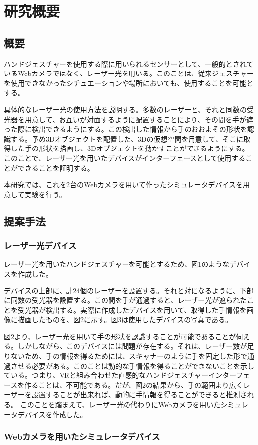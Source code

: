 \section{研究概要}

\subsection{概要}
ハンドジェスチャーを使用する際に用いられるセンサーとして、一般的とされているWebカメラではなく、レーザー光を用いる。このことは、従来ジェスチャーを使用できなかったシチュエーションや場所においても、使用することを可能とする。

具体的なレーザー光の使用方法を説明する。多数のレーザーと、それと同数の受光器を用意して、お互いが対面するように配置することにより、その間を手が遮った際に検出できるようにする。この検出した情報から手のおおよその形状を認識する。予め3Dオブジェクトを配置した、3Dの仮想空間を用意して、そこに取得した手の形状を描画し、3Dオブジェクトを動かすことができるようにする。このことで、レーザー光を用いたデバイスがインターフェースとして使用することができることを証明する。

本研究では、これを2台のWebカメラを用いて作ったシミュレータデバイスを用意して実験を行う。

\subsection{提案手法}
\subsubsection{レーザー光デバイス}
レーザー光を用いたハンドジェスチャーを可能とするため、図1のようなデバイスを作成した。

デバイスの上部に、計24個のレーザーを設置する。それと対になるように、下部に同数の受光器を設置する。この間を手が通過すると、レーザー光が遮られたことを受光器が検出する。実際に作成したデバイスを用いて、取得した手情報を画像に描画したものを、図2に示す。図3は使用したデバイスの写真である。

図2より、レーザー光を用いて手の形状を認識することが可能であることが伺える。しかしながら、このデバイスには問題が存在する。それは、レーザー数が足りないため、手の情報を得るためには、スキャナーのように手を固定した形で通過させる必要がある。このことは動的な手情報を得ることができないことを示している。つまり、VRと組み合わせた直感的なハンドジェスチャーインターフェースを作ることは、不可能である。だが、図2の結果から、手の範囲より広くレーザーを設置することが出来れば、動的に手情報を得ることができると推測される。%
このことを踏まえて、レーザー光の代わりにWebカメラを用いたシミュレータデバイスを作成した。

\subsubsection{Webカメラを用いたシミュレータデバイス}